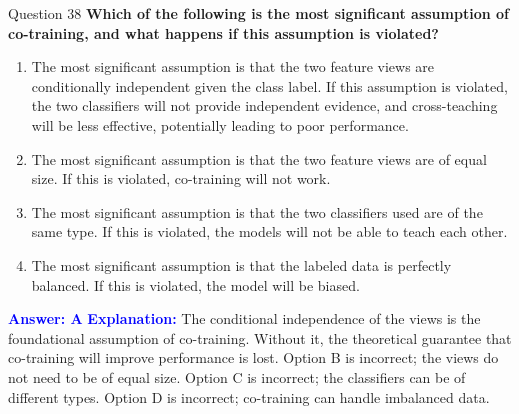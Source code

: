 \documentclass[8pt]{beamer}  %
\begin{document}
	\begin{frame}{Question 38}
		\textbf{Which of the following is the most significant assumption of co-training, and what happens if this assumption is violated?}
		\begin{enumerate}
			\item The most significant assumption is that the two feature views are conditionally independent given the class label. If this assumption is violated, the two classifiers will not provide independent evidence, and cross-teaching will be less effective, potentially leading to poor performance.
			\item The most significant assumption is that the two feature views are of equal size. If this is violated, co-training will not work.
			\item The most significant assumption is that the two classifiers used are of the same type. If this is violated, the models will not be able to teach each other.
			\item The most significant assumption is that the labeled data is perfectly balanced. If this is violated, the model will be biased.
		\end{enumerate}
		\vspace{0.2cm}
		\textcolor{blue}{\textbf{Answer: A}}
		\vspace{0.2cm}
		\textcolor{blue}{\textbf{Explanation:}} The conditional independence of the views is the foundational assumption of co-training. Without it, the theoretical guarantee that co-training will improve performance is lost. Option B is incorrect; the views do not need to be of equal size. Option C is incorrect; the classifiers can be of different types. Option D is incorrect; co-training can handle imbalanced data.
	\end{frame}
	
\end{document}
